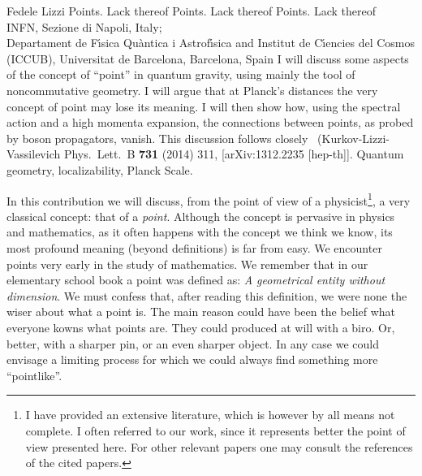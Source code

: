 \begin{artengenv}{Fedele Lizzi}
	{Points. Lack thereof}
	{Points. Lack thereof}
	{Points. Lack thereof}
	{\\
	INFN, Sezione di Napoli, Italy;\\
	Departament de F\'{\i}sica Qu\`antica i Astrof\'{\i}sica and Institut de C\'{\i}encies del Cosmos (ICCUB),
	Universitat de Barcelona, Barcelona, Spain}
	{I will discuss some aspects of the concept of ``point'' in quantum gravity, using mainly the tool of noncommutative geometry. I will argue that at Planck's distances the very concept of point may lose its meaning. I will then show how, using the spectral action and a high momenta expansion,  the connections between points, as probed by boson propagators, vanish. This discussion follows closely~\parencite{Kuliva} (Kurkov-Lizzi-Vassilevich Phys.\ Lett.\ B {\bf 731} (2014) 311, 
		[arXiv:1312.2235 [hep-th]].}
	{Quantum geometry, localizability, Planck Scale.}
	



\lettrine[loversize=0.13,lines=2,lraise=-0.05,nindent=0em,findent=0.2pt]%
{I}{}n this contribution we will discuss, from the point of view of a physicist\footnote{I have provided an extensive literature, which is however by all means not complete. I often referred to our work, since it represents better the point of view presented here. For other relevant papers one may consult the references of the cited papers.}, a very classical concept: that of a \emph{point}. Although the concept is pervasive in physics and mathematics, as it often happens with the concept we think we know, its most profound meaning (beyond definitions) is far from easy. We encounter points very early in the study of mathematics. We remember that in our elementary school book a point was defined as: \emph{A geometrical entity without dimension}. We must confess that, after reading this definition, we were none the wiser about what a point is. The main reason could have been the belief what everyone kowns what  points are. They could produced at will with a biro. Or, better, with a sharper pin, or an even sharper object. In any case we could envisage a limiting process for which we could always find something more ``pointlike''.


\end{artengenv}
